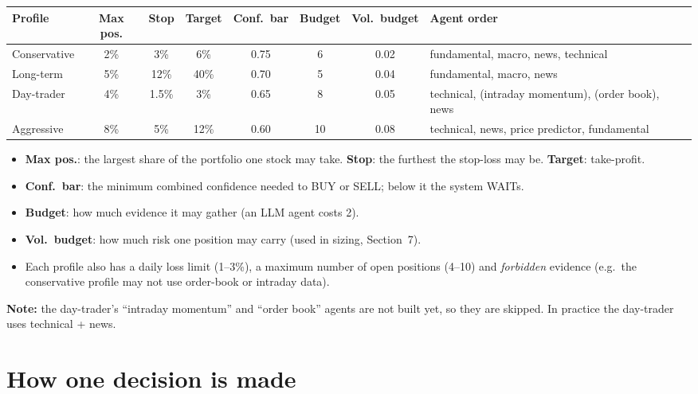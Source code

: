 \documentclass[10.5pt,a4paper]{article}
\begin{document}
{\small
\begin{tabularx}{\linewidth}{L{2.0cm}ccccccY}
\toprule
\textbf{Profile} & \textbf{Max pos.} & \textbf{Stop} & \textbf{Target} & \textbf{Conf.\ bar} & \textbf{Budget} & \textbf{Vol.\ budget} & \textbf{Agent order} \\
\midrule
Conservative & 2\% & 3\% & 6\% & 0.75 & 6 & 0.02 & fundamental, macro, news, technical \\
Long-term & 5\% & 12\% & 40\% & 0.70 & 5 & 0.04 & fundamental, macro, news \\
Day-trader & 4\% & 1.5\% & 3\% & 0.65 & 8 & 0.05 & technical, (intraday momentum), (order book), news \\
Aggressive & 8\% & 5\% & 12\% & 0.60 & 10 & 0.08 & technical, news, price predictor, fundamental \\
\bottomrule
\end{tabularx}}

\begin{itemize}
\item \textbf{Max pos.}: the largest share of the portfolio one stock may take. \textbf{Stop}: the furthest the stop-loss may be. \textbf{Target}: take-profit.
\item \textbf{Conf.\ bar}: the minimum combined confidence needed to BUY or SELL; below it the system WAITs.
\item \textbf{Budget}: how much evidence it may gather (an LLM agent costs 2).
\item \textbf{Vol.\ budget}: how much risk one position may carry (used in sizing, Section~7).
\item Each profile also has a daily loss limit (1--3\%), a maximum number of open positions (4--10) and \emph{forbidden} evidence (e.g.\ the conservative profile may not use order-book or intraday data).
\end{itemize}
\textbf{Note:} the day-trader's ``intraday momentum'' and ``order book'' agents are not built yet, so they are skipped. In practice the day-trader uses technical + news.

\clearpage
\section{How one decision is made}
\end{document}
